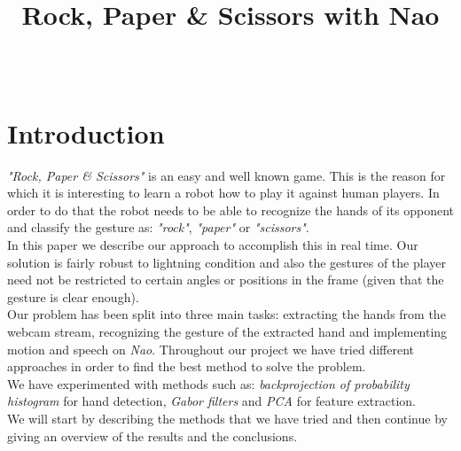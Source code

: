 \documentclass[a4paper, 11pt, twocolumn]{article}
\date{} %
\author{\fade{Nimrod Raiman [0336696]}\\\fade{Silvia L. Pintea [6109960]}}
\title{Rock, Paper \& Scissors with Nao}
\begin{document}
    \maketitle
    \section{Introduction}
	\label{sec:intro}
        \emph{"Rock, Paper \& Scissors"} is an easy and well known game. This is the reason for which it is interesting to learn a robot how to play it against human players. In order to do that the robot needs to be able to recognize the hands of its opponent and classify the gesture as: \emph{"rock"}, \emph{"paper"} or \emph{"scissors"}.\\	
		\hspace*{10px}In this paper we describe our approach to accomplish this in real time. Our solution is fairly robust to lightning condition and also the gestures of the player need not be restricted to certain angles or positions in the frame (given that the gesture is clear enough).\\ 
        \hspace*{10px}Our problem has been split into three main tasks: extracting the hands from the webcam stream, recognizing the gesture of the extracted hand and implementing motion and speech on \emph{Nao}. Throughout our project we have tried different approaches in order to find the best method to solve the problem.\\
		 \hspace*{10px}We have experimented with methods such as: \emph{backprojection of probability histogram} for hand detection, \emph{Gabor filters} and \emph{PCA} for feature extraction.\\
		 \hspace*{10px}We will start by describing the methods that we have tried and then continue by giving an overview of the results and the conclusions.   
\end{document}
